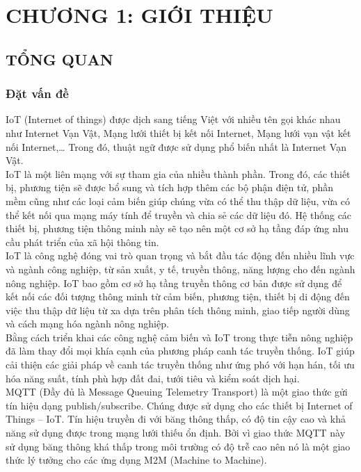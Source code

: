\section*{CHƯƠNG 1: GIỚI THIỆU}
\setcounter{section}{1}
\setcounter{figure}{0}
\subsection{TỔNG QUAN}
\subsubsection{Đặt vấn đề}
IoT (Internet of things) được dịch sang tiếng Việt với nhiều tên gọi khác nhau như Internet Vạn Vật, Mạng lưới thiết bị kết nối Internet, Mạng lưới vạn vật kết nối Internet,… Trong đó, thuật ngữ được sử dụng phổ biến nhất là Internet Vạn Vật.\\
\indent IoT là một liên mạng với sự tham gia của nhiều thành phần. Trong đó, các thiết bị, phương tiện sẽ được bổ sung và tích hợp thêm các bộ phận điện tử, phần mềm cũng như các loại cảm biến giúp chúng vừa có thể thu thập dữ liệu, vừa có thể kết nối qua mạng máy tính để truyền và chia sẻ các dữ liệu đó. Hệ thống các thiết bị, phương tiện thông minh này sẽ tạo nên một cơ sở hạ tầng đáp ứng nhu cầu phát triển của xã hội thông tin.\\
\indent IoT là công nghệ đóng vai trò quan trọng và bắt đầu tác động đến nhiều lĩnh vực và ngành công nghiệp, từ sản xuất, y tế, truyền thông, năng lượng cho đến ngành nông nghiệp. IoT bao gồm cơ sở hạ tầng truyền thông cơ bản được sử dụng để kết nối các đối tượng thông minh từ cảm biến, phương tiện, thiết bị di động đến việc thu thập dữ liệu từ xa dựa trên phân tích thông minh, giao tiếp người dùng và cách mạng hóa ngành nông nghiệp.\\
\indent Bằng cách triển khai các công nghệ cảm biến và IoT trong thực tiễn nông nghiệp đã làm thay đổi mọi khía cạnh của phương pháp canh tác truyền thống. IoT giúp cải thiện các giải pháp về canh tác truyền thống như ứng phó với hạn hán, tối ưu hóa năng suất, tính phù hợp đất đai, tưới tiêu và kiểm soát dịch hại.\\
\indent MQTT (Đầy đủ là Message Queuing Telemetry Transport) là một giao thức gửi tín hiệu dạng publish/subscribe. Chúng được sử dụng cho các thiết bị Internet of Things – IoT. Tín hiệu truyền đi với băng thông thấp, có độ tin cậy cao và khả năng sử dụng được trong mạng lưới thiếu ổn định. Bởi vì giao thức MQTT này sử dụng băng thông khá thấp trong môi trường có độ trễ cao nên nó là một giao thức lý tưởng cho các ứng dụng M2M (Machine to Machine).\\
